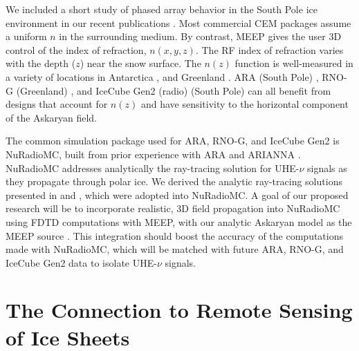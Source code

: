\documentclass[../../main.tex]{subfiles}
\begin{document}
We included a short study of phased array behavior in the South Pole ice environment in our recent publications \cite{electronics10040415,meepcon2022,10.1016/j.cpc.2009.11.008}.  Most commercial CEM packages assume a uniform $n$ in the surrounding medium.  By contrast, MEEP gives the user 3D control of the index of refraction, $n(x,y,z)$.  The RF index of refraction varies with the depth ($z$) near the snow surface.  The $n(z)$ function is well-measured in a variety of locations in Antarctica \cite{horizPaper}, and Greenland \cite{deaconu_2018}.  ARA (South Pole) \cite{PhysRevD.105.122006}, RNO-G (Greenland) \cite{rno}, and IceCube Gen2 (radio) (South Pole) \cite{Aartsen_2021} can all benefit from designs that account for $n(z)$ and have sensitivity to the horizontal component of the Askaryan field. \\ \vspace{2.5mm}

The common simulation package used for ARA, RNO-G, and IceCube Gen2 is NuRadioMC, built from prior experience with ARA and ARIANNA \cite{10.1140/epjc/s10052-020-7612-8,10.1109/tns.2015.2468182,10.1016/j.astropartphys.2011.11.010,Barwick:2014pca,10.1103/physrevd.102.043021}.  NuRadioMC addresses analytically the ray-tracing solution for UHE-$\nu$ signals as they propagate through polar ice.  We derived the analytic ray-tracing solutions presented in \cite{10.1140/epjc/s10052-020-7612-8} and \cite{horizPaper}, which were adopted into NuRadioMC.  A goal of our proposed research will be to incorporate realistic, 3D field propagation into NuRadioMC using FDTD computations with MEEP, with our analytic Askaryan model as the MEEP source \cite{PhysRevD.105.123019,10.22323/1.395.1217}.  This integration should boost the accuracy of the computations made with NuRadioMC, which will be matched with future ARA, RNO-G, and IceCube Gen2 data to isolate UHE-$\nu$ signals.

\section{The Connection to Remote Sensing of Ice Sheets}
\label{sec:cresis}
\end{document}
